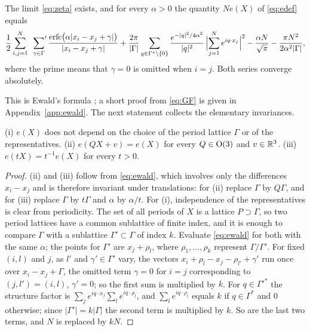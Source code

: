 \begin{proposition}\label{prop:ewald}
The limit \eqref{eq:zeta} exists, and for every $\alpha>0$ the quantity $Ne(X)$ of \eqref{eq:edef} equals
\begin{multline}\label{eq:ewald}
  \frac12\sum_{i,j=1}^N\ \sideset{}{'}\sum_{\gamma\in\Gamma}\frac{\erfc\bigl(\alpha|x_i-x_j+\gamma|\bigr)}{|x_i-x_j+\gamma|}
  +\frac{2\pi}{|\Gamma|}\sum_{q\in\Gamma^*\setminus\{0\}}\frac{e^{-|q|^2/4\alpha^2}}{|q|^2}\,\Bigl|\sum_{j=1}^Ne^{iq\cdot x_j}\Bigr|^2
  -\frac{\alpha N}{\sqrt\pi}-\frac{\pi N^2}{2\alpha^2|\Gamma|},
\end{multline}
where the prime means that $\gamma=0$ is omitted when $i=j$. Both series converge absolutely.
\end{proposition}

This is Ewald's formula \cite{Ewald1921}; a short proof from \eqref{eq:GF} is given in Appendix~\ref{app:ewald}. The next statement
collects the elementary invariances.

\begin{lemma}\label{lem:invariance}
\textup{(i)} $e(X)$ does not depend on the choice of the period lattice $\Gamma$ or of the representatives.
\textup{(ii)} $e(QX+v)=e(X)$ for every $Q\in\mathrm{O}(3)$ and $v\in\mathbb R^3$.
\textup{(iii)} $e(tX)=t^{-1}e(X)$ for every $t>0$.
\end{lemma}

\begin{proof}
(ii) and (iii) follow from \eqref{eq:ewald}, which involves only the differences $x_i-x_j$ and is therefore invariant under
translations: for (ii) replace $\Gamma$ by $Q\Gamma$, and for (iii) replace $\Gamma$ by $t\Gamma$ and $\alpha$
by $\alpha/t$. For (i), independence of the representatives is clear from periodicity. The set of all periods of $X$ is a lattice
$P\supset\Gamma$, so two period lattices have a common sublattice of finite index, and it is enough to compare $\Gamma$ with a sublattice
$\Gamma'\subset\Gamma$ of index $k$. Evaluate \eqref{eq:ewald} for both with the same $\alpha$; the points for $\Gamma'$ are $x_j+\rho_l$,
where $\rho_1,\dots,\rho_k$ represent $\Gamma/\Gamma'$. For fixed $(i,l)$ and $j$, as $l'$ and $\gamma'\in\Gamma'$ vary, the vectors
$x_i+\rho_l-x_j-\rho_{l'}+\gamma'$ run once over $x_i-x_j+\Gamma$, the omitted term $\gamma=0$ for $i=j$ corresponding to
$(j,l')=(i,l)$, $\gamma'=0$; so the first sum is multiplied by $k$. For $q\in\Gamma'^*$ the structure factor is
$\sum_je^{iq\cdot x_j}\sum_le^{iq\cdot\rho_l}$, and $\sum_le^{iq\cdot\rho_l}$ equals $k$ if $q\in\Gamma^*$ and $0$ otherwise; since
$|\Gamma'|=k|\Gamma|$ the second term is multiplied by $k$. So are the last two terms, and $N$ is replaced by $kN$.
\end{proof}

